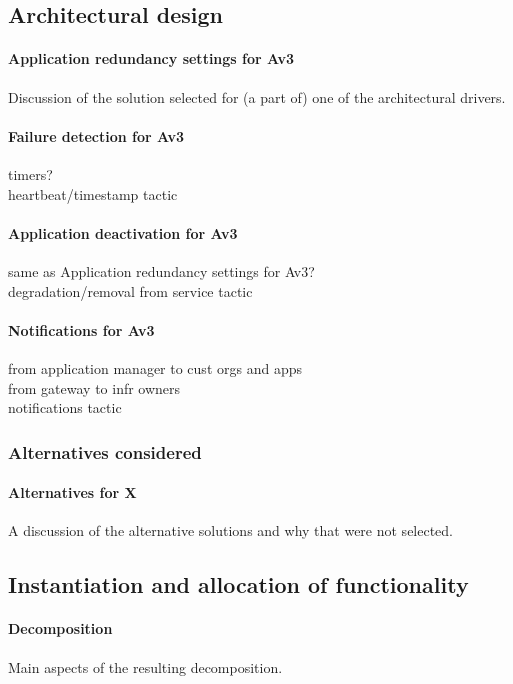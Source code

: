 \subsection{Architectural design}
    \paragraph{Application redundancy settings for Av3}
        Discussion of the solution selected for (a part of) one of the architectural
        drivers.

    \paragraph{Failure detection for Av3}
        timers? \\
        heartbeat/timestamp tactic

    \paragraph{Application deactivation for Av3}
        same as Application redundancy settings for Av3? \\
        degradation/removal from service tactic

    \paragraph{Notifications for Av3}
        from application manager to cust orgs and apps \\
        from gateway to infr owners \\
        notifications tactic

    \subsubsection{Alternatives considered}
        \paragraph{Alternatives for X}
            A discussion of the alternative solutions and why that were not selected.


\subsection{Instantiation and allocation of functionality}
    \paragraph{Decomposition}
        Main aspects of the resulting decomposition.

